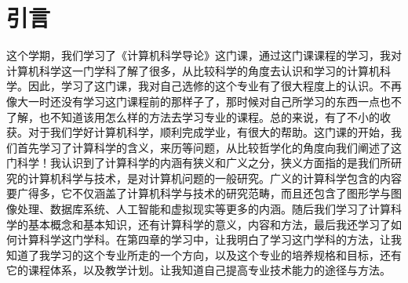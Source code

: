 \documentclass{article}
\begin{document}
\thispagestyle{empty}
\newpage
\setcounter{page}{1}
\section{引言}
    这个学期，我们学习了《计算机科学导论》这门课，通过这门课课程的学习，我对计算机科学这一门学科了解了很多，从比较科学的角度去认识和学习的计算机科学。因此，学习了这门课，我对自己选修的这个专业有了很大程度上的认识。不再像大一时还没有学习这门课程前的那样子了，那时候对自己所学习的东西一点也不了解，也不知道该用怎么样的方法去学习专业的课程。总的来说，有了不小的收获。对于我们学好计算机科学，顺利完成学业，有很大的帮助。这门课的开始，我们首先学习了计算科学的含义，来历等问题，从比较哲学化的角度向我们阐述了这门科学！我认识到了计算科学的内涵有狭义和广义之分，狭义方面指的是我们所研究的计算机科学与技术，是对计算机问题的一般研究。广义的计算科学包含的内容要广得多，它不仅涵盖了计算机科学与技术的研究范畴，而且还包含了图形学与图像处理、数据库系统、人工智能和虚拟现实等更多的内涵。随后我们学习了计算科学的基本概念和基本知识，还有计算科学的意义，内容和方法，最后我还学习了如何计算科学这门学科。在第四章的学习中，让我明白了学习这门学科的方法，让我知道了我学习的这个专业所走的一个方向，以及这个专业的培养规格和目标，还有它的课程体系，以及教学计划。让我知道自己提高专业技术能力的途径与方法。
\end{document}

